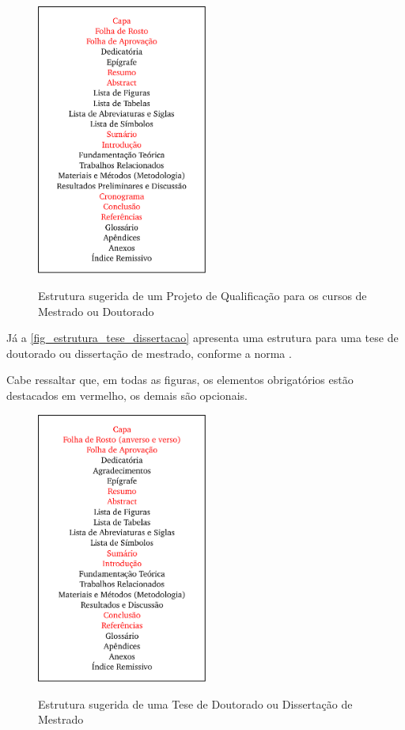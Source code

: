 \begin{apendicesenv}
    \begin{figure}[!htb]
        \centering
        \caption{Estrutura sugerida de um Projeto de Qualificação para os cursos de Mestrado ou Doutorado}
        \includegraphics[width=0.5\textwidth]{figuras/estrutura-projeto-qualificacao}
        \label{fig_estrutura_projeto_qualificacao}
    \end{figure}

    Já a \autoref{fig_estrutura_tese_dissertacao} apresenta uma estrutura para uma tese de doutorado ou dissertação de mestrado, conforme a norma .

    Cabe ressaltar que, em todas as figuras, os elementos obrigatórios estão destacados em vermelho, os demais são opcionais.

    \begin{figure}[!htb]
        \centering
        \caption{Estrutura sugerida de uma Tese de Doutorado ou Dissertação de Mestrado}
        \includegraphics[width=0.5\textwidth]{figuras/estrutura-tese-dissertacao}
        \label{fig_estrutura_tese_dissertacao}
    \end{figure}


\end{apendicesenv}
